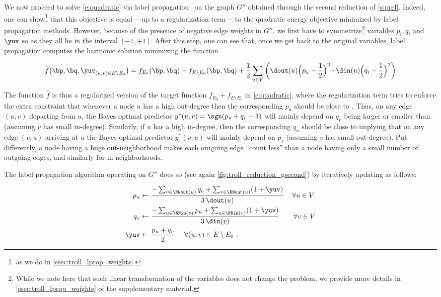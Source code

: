 We now proceed to solve \eqref{e:quadratic} via label propagation~\autocite{LabelPropa03} on the
graph $G''$ obtained through the second reduction of \autoref{s:prel}.
Indeed, one can show\footnote{as we do in \autoref{ssec:troll_lprop_weights}.} that this objective is
equal ---up to a regularization term--- to the quadratic energy objective minimized by label
propagation methods.
However, because of the presence of negative edge weights in $G''$, we first have to symmetrize\footnote{%
While we note here that such linear transformation of the variables does not change the problem, we
provide more details in \autoref{ssec:troll_lprop_weights} of the supplementary material.} variables
$p_i, q_i$ and $\yuv$ so as they all lie in the interval $[-1,+1]$.
After this step, one can see that, once we get back to the original variables, label propagation
computes the harmonic solution minimizing the function

\begin{equation*}
{\widehat f}\big(\bp,\bq,{\yuv}_{(u,v) \in E\setminus E_0}\big)
= f_{E_0}(\bp,\bq) + f_{E\setminus E_0}(\bp,\bq)
+ \frac{1}{2}\sum_{u\in V}
\left(\dout(u)\Bigl(p_u-\frac{1}{2}\Bigl)^2+\din(u)\Bigl(q_i-\frac{1}{2}\Bigl)^2\right)
\end{equation*}

The function ${\widehat f}$ is thus a regularized version of the target function $f_{E_0} +
f_{E\setminus E_0}$ in \eqref{e:quadratic}, where the regularization term tries to enforce the extra
constraint that whenever a node $u$ has a high out-degree then the corresponding $p_u$ should be
close to \shalf. Thus, on any edge $(u,v)$ departing from $u$, the Bayes optimal predictor $y^*(u,v)
= \sgn(p_u+q_v-1)$ will mainly depend on $q_v$ being larger or smaller than \shalf{} (assuming $v$
has small in-degree). Similarly, if $u$ has a high in-degree, then the corresponding $q_u$ should be
close to \shalf{} implying that on any edge $(v,u)$ arriving at $u$ the Bayes optimal predictor
$y^*(v,u)$ will mainly depend on $p_v$ (assuming $v$ has small out-degree). Put differently, a node
having a huge out-neighborhood makes each outgoing edge \enquote{count less} than a node having only
a small number of outgoing edges, and similarly for in-neighborhoods.

The label propagation algorithm operating on $G''$ does so (see again
\autoref{fig:troll_reduction_gsecond}) by iteratively updating as follows:

\begin{align*}
  p_{u}  & \leftarrow \frac{-\sum_{v \in \NNout(u)} q_{v} + \sum_{v \in \NNout(u)} (1+\yuv)}{3\,\dout(u)}\,\quad\forall u\in V\\
  q_{v}  & \leftarrow \frac{-\sum_{u \in  \NNin(v)} p_{u} + \sum_{u \in \NNin(v) } (1+\yuv)}{3\,\din(v)}\qquad\forall v \in V\\
  \yuv & \leftarrow \frac{p_u + q_v}{2}~ \quad \forall (u,v) \in E\setminus E_0~.
\end{align*}

